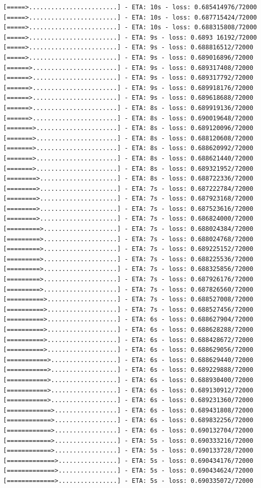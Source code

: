 \documentclass[12pt,fleqn]{article}\usepackage{../../common}
\begin{document}
\begin{verbatim}
[=====>........................] - ETA: 10s - loss: 0.685414976/72000 [=====>........................] - ETA: 10s - loss: 0.687715424/72000 [=====>........................] - ETA: 10s - loss: 0.688315808/72000 [=====>........................] - ETA: 9s - loss: 0.6893 16192/72000 [=====>........................] - ETA: 9s - loss: 0.688816512/72000 [=====>........................] - ETA: 9s - loss: 0.689016896/72000 [======>.......................] - ETA: 9s - loss: 0.689317408/72000 [======>.......................] - ETA: 9s - loss: 0.689317792/72000 [======>.......................] - ETA: 9s - loss: 0.689918176/72000 [======>.......................] - ETA: 9s - loss: 0.689618688/72000 [======>.......................] - ETA: 8s - loss: 0.689919136/72000 [======>.......................] - ETA: 8s - loss: 0.690019648/72000 [=======>......................] - ETA: 8s - loss: 0.689120096/72000 [=======>......................] - ETA: 8s - loss: 0.688120608/72000 [=======>......................] - ETA: 8s - loss: 0.688620992/72000 [=======>......................] - ETA: 8s - loss: 0.688621440/72000 [=======>......................] - ETA: 8s - loss: 0.689321952/72000 [========>.....................] - ETA: 8s - loss: 0.688722336/72000 [========>.....................] - ETA: 7s - loss: 0.687222784/72000 [========>.....................] - ETA: 7s - loss: 0.687923168/72000 [========>.....................] - ETA: 7s - loss: 0.687523616/72000 [========>.....................] - ETA: 7s - loss: 0.686824000/72000 [=========>....................] - ETA: 7s - loss: 0.688024384/72000 [=========>....................] - ETA: 7s - loss: 0.688024768/72000 [=========>....................] - ETA: 7s - loss: 0.689225152/72000 [=========>....................] - ETA: 7s - loss: 0.688225536/72000 [=========>....................] - ETA: 7s - loss: 0.688325856/72000 [=========>....................] - ETA: 7s - loss: 0.687926176/72000 [=========>....................] - ETA: 7s - loss: 0.687826560/72000 [==========>...................] - ETA: 7s - loss: 0.688527008/72000 [==========>...................] - ETA: 7s - loss: 0.688527456/72000 [==========>...................] - ETA: 6s - loss: 0.688627904/72000 [==========>...................] - ETA: 6s - loss: 0.688628288/72000 [==========>...................] - ETA: 6s - loss: 0.688428672/72000 [==========>...................] - ETA: 6s - loss: 0.688629056/72000 [===========>..................] - ETA: 6s - loss: 0.688629440/72000 [===========>..................] - ETA: 6s - loss: 0.689229888/72000 [===========>..................] - ETA: 6s - loss: 0.688930400/72000 [===========>..................] - ETA: 6s - loss: 0.689130912/72000 [===========>..................] - ETA: 6s - loss: 0.689231360/72000 [============>.................] - ETA: 6s - loss: 0.689431808/72000 [============>.................] - ETA: 6s - loss: 0.689832256/72000 [============>.................] - ETA: 6s - loss: 0.690132704/72000 [============>.................] - ETA: 5s - loss: 0.690333216/72000 [============>.................] - ETA: 5s - loss: 0.690133728/72000 [=============>................] - ETA: 5s - loss: 0.690434176/72000 [=============>................] - ETA: 5s - loss: 0.690434624/72000 [=============>................] - ETA: 5s - loss: 0.690335072/72000 
\end{verbatim}
\end{document}
